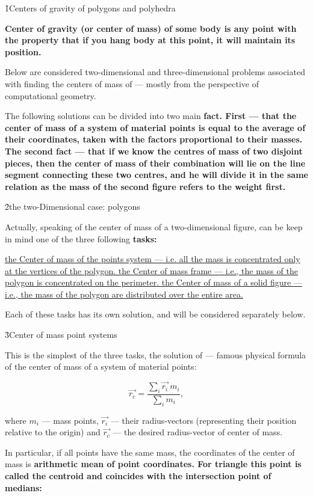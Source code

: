 \h1{Centers of gravity of polygons and polyhedra}

\bf{Center of gravity} (or \bf{center of mass}) of some body is any point with the property that if you hang body at this point, it will maintain its position.

Below are considered two-dimensional and three-dimensional problems associated with finding the centers of mass of --- mostly from the perspective of computational geometry.

The following solutions can be divided into two main \bf{fact}. First --- that the center of mass of a system of material points is equal to the average of their coordinates, taken with the factors proportional to their masses. The second fact --- that if we know the centres of mass of two disjoint pieces, then the center of mass of their combination will lie on the line segment connecting these two centres, and he will divide it in the same relation as the mass of the second figure refers to the weight first.


\h2{the two-Dimensional case: polygons}

Actually, speaking of the center of mass of a two-dimensional figure, can be keep in mind one of the three following \bf{tasks}:

\ul{
\li the Center of mass of the points system --- i.e. all the mass is concentrated only at the vertices of the polygon.
\li the Center of mass frame --- i.e., the mass of the polygon is concentrated on the perimeter.
\li the Center of mass of a solid figure --- i.e., the mass of the polygon are distributed over the entire area.
}

Each of these tasks has its own solution, and will be considered separately below.


\h3{Center of mass point systems}

This is the simplest of the three tasks, the solution of --- famous physical formula of the center of mass of a system of material points:

$$ \vec{r_c} = \frac{ \sum\limits_i \vec{r_i} ~ m_i }{ \sum\limits_i m_i }, $$

where $m_i$ --- mass points, $\vec{r_i}$ --- their radius-vectors (representing their position relative to the origin) and $\vec{r_c}$ --- the desired radius-vector of center of mass.

In particular, if all points have the same mass, the coordinates of the center of mass is \bf{arithmetic mean} of point coordinates. For \bf{triangle} this point is called the \bf{centroid} and coincides with the intersection point of medians:


